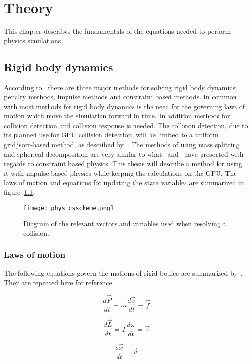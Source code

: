\chapter{Theory}\label{cha:theory}
This chapter describes the fundamentals of the equations needed to perform physics simulations.
\section{Rigid body dynamics}
According to~\cite{baberrigid} there are three major methods for solving rigid body
dynamics; penalty methods, impulse methods and constraint based methods.
In common with most methods for rigid body dynamics is the need for the governing laws of
motion which move the simulation forward in time. In addition methods for collision detection
and collision response is needed. The collision detection, due to its planned use for GPU collision
detection, will be limited to a uniform grid/sort-based method, as described by~\cite{gpugems}.
The methods of using mass splitting and spherical decomposition are very similar
to what~\cite{flex} and~\cite{bulletPipeline} have presented with regards to
constraint based physics. This thesis will describe a method for using it with
impulse based physics while keeping the calculations on the GPU. The laws of motion and equations
for updating the state variables are summarized in figure~\ref{fig:diag}.
\begin{figure}[H]
  \centering
  \texttt{[image: physicsscheme.png]}
  \caption{Diagram of the relevant vectors and variables used when resolving a collision.}
  \label{fig:diag}
\end{figure}

\subsection{Laws of motion}
The following equations govern the motions of rigid bodies are summarized by~\cite{hansson}. They are repeated here for reference.

\begin{equation}
  \frac{d\vec{P}}{dt}=m\frac{d\vec{v}}{dt} = \vec{f}
\end{equation}

\begin{equation}
  \frac{d\vec{L}}{dt}=\vec{I}\frac{d\vec{\omega}}{dt} = \vec{\tau}
\end{equation}

\begin{equation}
  \frac{d\vec{x}}{dt}=\vec{v}
\end{equation}

